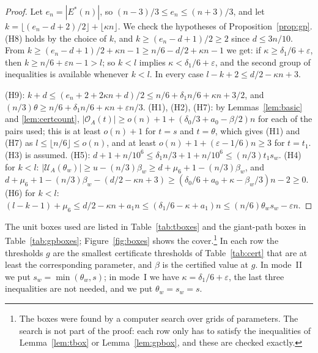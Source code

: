 \documentclass[11pt,a4paper]{article}
\theoremstyle{definition}
\theoremstyle{remark}
\newcommand{\Es}{E^{*}}
\newcommand{\eps}{\varepsilon}
\newcommand{\OA}{\mathcal{O}_A}
\newcommand{\UA}{\mathcal{U}_A}
\begin{document}
\begin{proof}
Let $e_n=|\Es(n)|$, so $(n-3)/3\le e_n\le(n+3)/3$, and let $k=\lfloor(e_n-d+2)/2\rfloor+\lfloor\kappa
n\rfloor$. We check the hypotheses of Proposition~\ref{prop:gp}. (H8) holds by the choice of $k$, and
$k\ge(e_n-d+1)/2\ge2$ since $d\le3n/10$. From $k\ge(e_n-d+1)/2+\kappa n-1\ge n/6-d/2+\kappa n-1$ we get:
if $\kappa\ge\delta_1/6+\eps$, then $k\ge n/6+\eps n-1>l$; so $k<l$ implies $\kappa<\delta_1/6+
\eps$, and the second group of inequalities is available whenever $k<l$. In every case $l-k+2\le d/2-\kappa
n+3$.

(H9): $k+d\le(e_n+2+2\kappa n+d)/2\le n/6+\delta_1n/6+\kappa n+3/2$, and $(n/3)\theta\ge n/6+\delta_1n/6
+\kappa n+\eps n/3$. (H1), (H2), (H7): by Lemmas~\ref{lem:basic} and \ref{lem:certcount},
$|\OA(t)|\ge o(n)+1+(\delta_0/3+a_0-\beta/2)n$ for each of the pairs used; this is at least $o(n)+1$ for
$t=s$ and $t=\theta$, which gives (H1) and (H7) as $l\le\lfloor n/6\rfloor\le o(n)$, and at least
$o(n)+1+(\eps-1/6)n\ge3$ for $t=t_1$. (H3) is assumed. (H5): $d+1+n/10^6\le\delta_1n/3+1+n/10^6\le
(n/3)t_1s_w$. (H4) for $k<l$: $|\UA(\theta_w)|\ge u-(n/3)\beta_w\ge d+\mu_6+1-(n/3)\beta_w$, and
$d+\mu_6+1-(n/3)\beta_w-(d/2-\kappa n+3)\ge(\delta_0/6+a_0+\kappa-\beta_w/3)n-2\ge0$. (H6) for $k<l$:
$(l-k-1)+\mu_6\le d/2-\kappa n+a_1n\le(\delta_1/6-\kappa+a_1)n\le(n/6)\theta_ws_w-\eps n$.
\end{proof}

The unit boxes used are listed in Table~\ref{tab:tboxes} and the giant-path boxes in
Table~\ref{tab:gpboxes}; Figure~\ref{fig:boxes} shows the cover.\footnote{The boxes were found by a computer search over grids of parameters. The
search is not part of the proof: each row only has to satisfy the inequalities of
Lemma~\ref{lem:tbox} or Lemma~\ref{lem:gpbox}, and these are checked exactly.} In each row the thresholds $g$ are
the smallest certificate thresholds of Table~\ref{tab:cert} that are at least the corresponding
parameter, and $\beta$ is the certified value at $g$. In mode~II we put $s_w=\min(\theta_w,s)$; in
mode~I we have $\kappa=\delta_1/6+\eps$, the last three inequalities are not needed, and we put
$\theta_w=s_w=s$.
\end{document}
